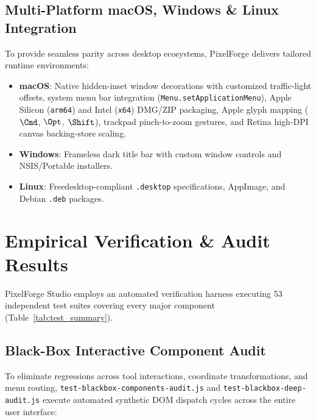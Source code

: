 \documentclass[10pt,journal,compsoc]{IEEEtran}
\begin{document}
\subsection{Multi-Platform macOS, Windows \& Linux Integration}
To provide seamless parity across desktop ecosystems, PixelForge delivers tailored runtime environments:
\begin{itemize}
    \item \textbf{macOS}: Native hidden-inset window decorations with customized traffic-light offsets, system menu bar integration (\texttt{Menu.setApplicationMenu}), Apple Silicon (\texttt{arm64}) and Intel (\texttt{x64}) DMG/ZIP packaging, Apple glyph mapping ($\Cmd$, $\Opt$, $\Shift$), trackpad pinch-to-zoom gestures, and Retina high-DPI canvas backing-store scaling.
    \item \textbf{Windows}: Frameless dark title bar with custom window controls and NSIS/Portable installers.
    \item \textbf{Linux}: Freedesktop-compliant \texttt{.desktop} specifications, AppImage, and Debian \texttt{.deb} packages.
\end{itemize}

\section{Empirical Verification \& Audit Results}
PixelForge Studio employs an automated verification harness executing 53 independent test suites covering every major component (Table~\ref{tab:test_summary}).

\subsection{Black-Box Interactive Component Audit}
To eliminate regressions across tool interactions, coordinate transformations, and menu routing, \texttt{test-blackbox-components-audit.js} and \texttt{test-blackbox-deep-audit.js} execute automated synthetic DOM dispatch cycles across the entire user interface:
\end{document}
